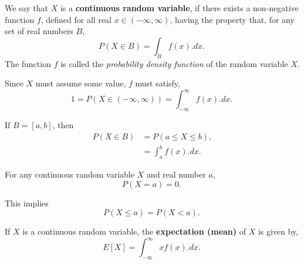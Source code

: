 \begin{defn} \label{mod2:defn:ContinuousRandomVar}
	We say that $X$ is a \textbf{continuous random variable}, if there exists a non-negative function $f$, defined for all real $x \in (-\infty,\infty)$, having the property that, for any set of real numbers $B$,
	\begin{equation}
	P(X \in B) = \int_B f(x).dx. \
	\end{equation}
	The function $f$ is called the \textit{probability density function} of the random variable $X$.
\end{defn}


\begin{prop} \label{mod2:prop:ContinuousRV:1}
	Since $X$ must assume some value, $f$ must satisfy,
	\begin{equation}
	1 = P(X \in (-\infty,\infty)) = \int_{-\infty}^{\infty} f(x).dx.  \
	\end{equation}
\end{prop}

\begin{note} \label{mod2:note:ContinuousRV:Note1}
	If $B=[a,b]$, then
	\begin{align}
	P(X\in B) &= P(a \leq X \leq b), \\
	&= \int_a^b f(x) .dx. \
	\end{align}
\end{note}

\begin{prop} \label{mod2:prop:ContinuousRV:2}
	For any continuous random variable $X$ and real number $a$,
	\begin{equation}
	P(X=a) = 0.\
	\end{equation}
\end{prop}

\begin{note} 
	This implies
	\begin{equation}
	P( X \leq a) = P(X<a). \
	\end{equation}
\end{note}

\begin{defn} \label{mod2:defn:ContinuousRV:Expectation}
	If $X$ is a continuous random variable, the \textbf{expectation (mean)} of $X$ is given by,
	\begin{equation}
	E[X] = \int_{-\infty}^{\infty}x f(x).dx. \label{mod2:eq:ContinuousRV:Expectation} \
	\end{equation}
\end{defn}

